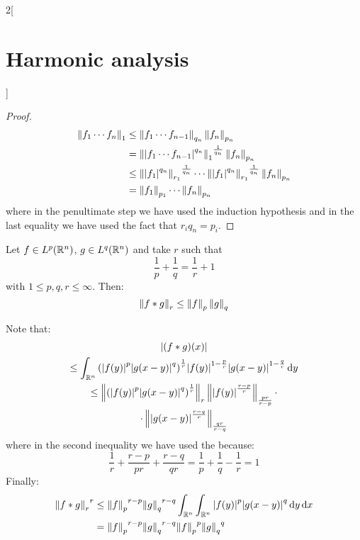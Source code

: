 \documentclass[../../../main_math.tex]{subfiles}
\begin{document}
\begin{multicols}{2}[\section{Harmonic analysis}]
\begin{proof}
    \begin{align*}
      \left\|{f_1\cdots f_n}\right\|_1 & \leq \left\|{f_1\cdots f_{n-1}}\right\|_{q_n}\left\|f_n\right\|_{p_n}                                                                    \\
                               & = {\left\|\abs{f_1\cdots f_{n-1}}^{q_n}\right\|_{1}}^{\frac{1}{q_n}}\left\|f_n\right\|_{p_n}                                             \\
                               & \leq {\left\|\abs{f_1}^{q_n}\right\|_{r_1}}^{\frac{1}{q_n}}\cdots {\left\|\abs{f_1}^{q_n}\right\|_{r_1}}^{\frac{1}{q_n}}\left\|f_n\right\|_{p_n} \\
                               & =\left\|f_1\right\|_{p_1}\cdots\left\|f_n\right\|_{p_n}
    \end{align*}
    where in the penultimate step we have used the induction hypothesis and in the last equality we have used the fact that $r_iq_n=p_i$.
  \end{proof}
  \begin{lemma}\label{HA:youngConvolution}
    Let $f\in L^p(\mathbb{R}^n)$, $g\in L^q(\mathbb{R}^n)$ and take $r$ such that $$\frac{1}{p}+\frac{1}{q}=\frac{1}{r}+1$$ with $1\leq p,q,r\leq \infty$. Then: $$\left\|f*g\right\|_r\leq\left\|f\right\|_p\left\|g\right\|_q$$
  \end{lemma}
  \begin{sproof}
    Note that:
    \begin{multline*}
      \abs{(f*g)(x)} \\
      \leq\int_{\mathbb{R}^n}{\left(\abs{f(y)}^{p}\abs{g(x-y)}^{q}\right)}^\frac{1}{r}\abs{f(y)}^{1-\frac{p}{r}}\abs{g(x-y)}^{1-\frac{q}{r}}\dd{y}    \\
      \leq \left\|{\left(\abs{f(y)}^{p}\abs{g(x-y)}^{q}\right)}^\frac{1}{r}\right\|_r\left\|\abs{f(y)}^{\frac{r-p}{r}}\right\|_{\frac{pr}{r-p}}\cdot\\\cdot\left\|\abs{g(x-y)}^{\frac{r-q}{r}}\right\|_{\frac{qr}{r-q}}
    \end{multline*}
    where in the second inequality we have used the  because:
    $$\frac{1}{r}+\frac{r-p}{pr}+\frac{r-q}{qr}=\frac{1}{p}+\frac{1}{q}-\frac{1}{r}=1$$
    Finally:
    \begin{align*}
      {\norm{f*g}_r}^r & \leq {\norm{f}_p}^{r-p}{\norm{g}_q}^{r-q} \int_{\RR^n}\int_{\RR^n}\abs{f(y)}^{p}\abs{g(x-y)}^{q}\dd{y}\dd{x} \\
                       & ={\norm{f}_p}^{r-p}{\norm{g}_q}^{r-q} {\norm{f}_p}^{p}{\norm{g}_q}^{q}                                       \\

\end{align*}
\end{sproof}
\end{multicols}
\end{document}
